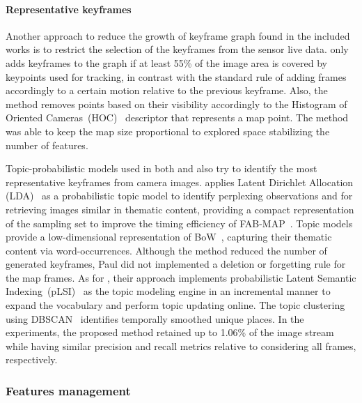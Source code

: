 \paragraph{Representative keyframes}

Another approach to reduce the growth of keyframe graph found in the included works is to restrict the selection of the keyframes from the sensor live data.
\cite{pirker-et-al:2011:6048253} only adds keyframes to the graph if at least 55\% of the image area is covered by keypoints used for tracking, in contrast with the standard rule of adding frames accordingly to a certain motion relative to the previous keyframe. Also, the method removes points based on their visibility accordingly to the Histogram of Oriented Cameras~(HOC)~\parencite{original:hoc} descriptor that represents a map point. The method was able to keep the map size proportional to explored space stabilizing the number of features.

Topic-probabilistic models used in both \cite{paul-newman:2013:0278364913509859} and \cite{murphy-sibley:2014:6907022} also try to identify the most representative keyframes from camera images.
\cite{paul-newman:2013:0278364913509859} applies Latent Dirichlet Allocation (LDA)~\parencite{original:lda} as a probabilistic topic model to identify perplexing observations and for retrieving images similar in thematic content, providing a compact representation of the sampling set to improve the timing efficiency of FAB-MAP~\parencite{discussion:fab-map}. Topic models provide a low-dimensional representation of BoW~\parencite{discussion:bow}, capturing their thematic content via word-occurrences. Although the method reduced the number of generated keyframes, Paul did not implemented a deletion or forgetting rule for the map frames.
As for \cite{murphy-sibley:2014:6907022}, their approach implements probabilistic Latent Semantic Indexing~(pLSI)~\parencite{original:plsi} as the topic modeling engine in an incremental manner to expand the vocabulary and perform topic updating online. The topic clustering using DBSCAN~\parencite{original:dbscan} identifies temporally smoothed unique places. In the experiments, the proposed method retained up to 1.06\% of the image stream while having similar precision and recall metrics relative to considering all frames, respectively.



\subsubsection{Features management}

